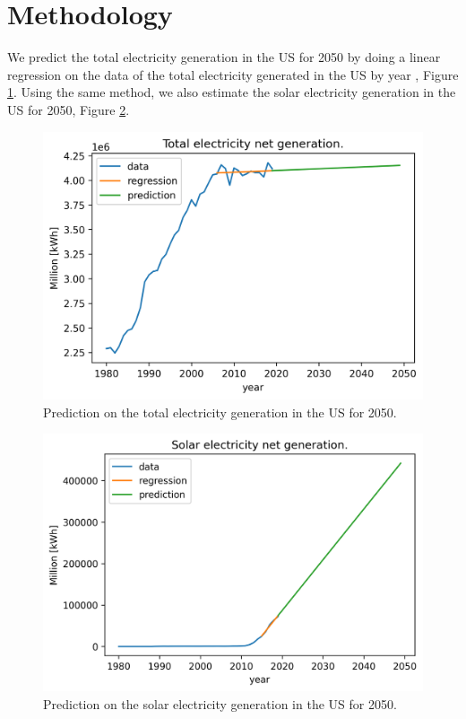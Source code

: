 \documentclass{anstrans}
\begin{document}
\section{Methodology}
\label{method}

We predict the total electricity generation in the \gls{US} for 2050 by doing a linear regression on the data of the total electricity generated in the US by year \cite{us_energy_information_administration_electric_2020}, Figure \ref{fig:us-pred1}.
Using the same method, we also estimate the solar electricity generation in the \gls{US} for 2050, Figure \ref{fig:us-pred2}.

\begin{figure}[H]
	\centering
	\includegraphics[width=1.0\linewidth]{figures/us-prediction1.png}
	\hfill
	\caption{Prediction on the total electricity generation in the \gls{US} for 2050.}
	\label{fig:us-pred1}
\end{figure}

\begin{figure}[H]
	\centering
	\includegraphics[width=1.0\linewidth]{figures/us-prediction2.png}
	\hfill
	\caption{Prediction on the solar electricity generation in the \gls{US} for 2050.}
	\label{fig:us-pred2}
\end{figure}
\end{document}
